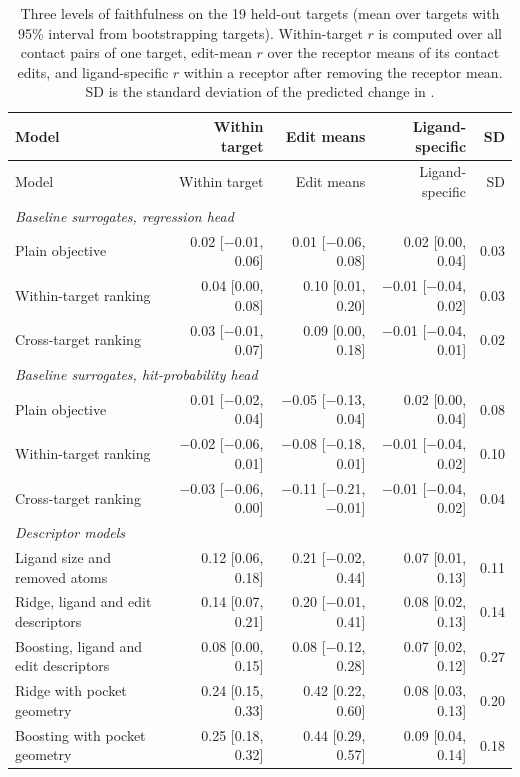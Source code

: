 \begin{longtable}{p{4.6cm}rrrr}
\caption{Three levels of faithfulness on the 19 held-out targets (mean over targets with 95\% interval from bootstrapping targets). Within-target $r$ is computed over all contact pairs of one target, edit-mean $r$ over the receptor means of its contact edits, and ligand-specific $r$ within a receptor after removing the receptor mean. SD is the standard deviation of the predicted change in \kcal{}.}
\label{tab:si_levels}\\
\toprule
Model & Within target & Edit means & Ligand-specific & SD \\
\midrule
\endfirsthead
Model & Within target & Edit means & Ligand-specific & SD \\
\midrule
\endhead
\multicolumn{5}{l}{\emph{Baseline surrogates, regression head}} \\
\quad Plain objective & 0.02 [$-$0.01, 0.06] & 0.01 [$-$0.06, 0.08] & 0.02 [0.00, 0.04] & 0.03 \\
\quad Within-target ranking & 0.04 [0.00, 0.08] & 0.10 [0.01, 0.20] & $-$0.01 [$-$0.04, 0.02] & 0.03 \\
\quad Cross-target ranking & 0.03 [$-$0.01, 0.07] & 0.09 [0.00, 0.18] & $-$0.01 [$-$0.04, 0.01] & 0.02 \\
\multicolumn{5}{l}{\emph{Baseline surrogates, hit-probability head}} \\
\quad Plain objective & 0.01 [$-$0.02, 0.04] & $-$0.05 [$-$0.13, 0.04] & 0.02 [0.00, 0.04] & 0.08 \\
\quad Within-target ranking & $-$0.02 [$-$0.06, 0.01] & $-$0.08 [$-$0.18, 0.01] & $-$0.01 [$-$0.04, 0.02] & 0.10 \\
\quad Cross-target ranking & $-$0.03 [$-$0.06, 0.00] & $-$0.11 [$-$0.21, $-$0.01] & $-$0.01 [$-$0.04, 0.02] & 0.04 \\
\multicolumn{5}{l}{\emph{Descriptor models}} \\
\quad Ligand size and removed atoms & 0.12 [0.06, 0.18] & 0.21 [$-$0.02, 0.44] & 0.07 [0.01, 0.13] & 0.11 \\
\quad Ridge, ligand and edit descriptors & 0.14 [0.07, 0.21] & 0.20 [$-$0.01, 0.41] & 0.08 [0.02, 0.13] & 0.14 \\
\quad Boosting, ligand and edit descriptors & 0.08 [0.00, 0.15] & 0.08 [$-$0.12, 0.28] & 0.07 [0.02, 0.12] & 0.27 \\
\quad Ridge with pocket geometry & 0.24 [0.15, 0.33] & 0.42 [0.22, 0.60] & 0.08 [0.03, 0.13] & 0.20 \\
\quad Boosting with pocket geometry & 0.25 [0.18, 0.32] & 0.44 [0.29, 0.57] & 0.09 [0.04, 0.14] & 0.18 \\

\end{longtable}
